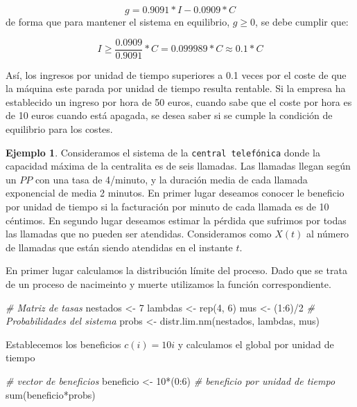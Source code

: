 \documentclass[
]{book}
\newenvironment{Shaded}{\begin{snugshade}}{\end{snugshade}}
\newcommand{\CommentTok}[1]{\textcolor[rgb]{0.56,0.35,0.01}{\textit{#1}}}
\newcommand{\DecValTok}[1]{\textcolor[rgb]{0.00,0.00,0.81}{#1}}
\newcommand{\FunctionTok}[1]{\textcolor[rgb]{0.00,0.00,0.00}{#1}}
\newcommand{\NormalTok}[1]{#1}
\newcommand{\OtherTok}[1]{\textcolor[rgb]{0.56,0.35,0.01}{#1}}
\newcommand{\SpecialCharTok}[1]{\textcolor[rgb]{0.00,0.00,0.00}{#1}}
\theoremstyle{definition}
\theoremstyle{definition}
\newtheorem{example}{Ejemplo}[chapter]
\theoremstyle{definition}
\theoremstyle{definition}
\theoremstyle{remark}
\begin{document}
\[ g = 0.9091*I - 0.0909*C\]
de forma que para mantener el sistema en equilibrio, \(g \geq 0\), se debe cumplir que:

\[I \geq \frac{0.0909}{0.9091}*C = 0.099989*C \approx 0.1*C\]

Así, los ingresos por unidad de tiempo superiores a 0.1 veces por el coste de que la máquina este parada por unidad de tiempo resulta rentable. Si la empresa ha establecido un ingreso por hora de 50 euros, cuando sabe que el coste por hora es de 10 euros cuando está apagada, se desea saber si se cumple la condición de equilibrio para los costes.

\begin{example}
Consideramos el sistema de la \texttt{central\ telefónica} donde la capacidad máxima de la centralita es de seis llamadas. Las llamadas llegan según un \(PP\) con una tasa de 4/minuto, y la duración media de cada llamada exponencial de media 2 minutos. En primer lugar deseamos conocer le beneficio por unidad de tiempo si la facturación por minuto de cada llamada es de 10 céntimos. En segundo lugar deseamos estimar la pérdida que sufrimos por todas las llamadas que no pueden ser atendidas. Consideramos como \(X(t)\) al número de llamadas que están siendo atendidas en el instante \(t\).
\end{example}

En primer lugar calculamos la distribución límite del proceso. Dado que se trata de un proceso de nacimeinto y muerte utilizamos la función correspondiente.

\begin{Shaded}
\begin{Highlighting}[]
\CommentTok{\# Matriz de tasas}
\NormalTok{nestados }\OtherTok{\textless{}{-}} \DecValTok{7}
\NormalTok{lambdas }\OtherTok{\textless{}{-}} \FunctionTok{rep}\NormalTok{(}\DecValTok{4}\NormalTok{, }\DecValTok{6}\NormalTok{) }
\NormalTok{mus }\OtherTok{\textless{}{-}}\NormalTok{ (}\DecValTok{1}\SpecialCharTok{:}\DecValTok{6}\NormalTok{)}\SpecialCharTok{/}\DecValTok{2}
\CommentTok{\# Probabilidades del sistema}
\NormalTok{probs }\OtherTok{\textless{}{-}} \FunctionTok{distr.lim.nm}\NormalTok{(nestados, lambdas, mus)}
\end{Highlighting}
\end{Shaded}

Establecemos los beneficios \(c(i) = 10i\) y calculamos el global por unidad de tiempo

\begin{Shaded}
\begin{Highlighting}[]
\CommentTok{\# vector de beneficios}
\NormalTok{beneficio }\OtherTok{\textless{}{-}} \DecValTok{10}\SpecialCharTok{*}\NormalTok{(}\DecValTok{0}\SpecialCharTok{:}\DecValTok{6}\NormalTok{) }
\CommentTok{\# beneficio por unidad de tiempo}
\FunctionTok{sum}\NormalTok{(beneficio}\SpecialCharTok{*}\NormalTok{probs)}
\end{Highlighting}
\end{Shaded}
\end{document}
